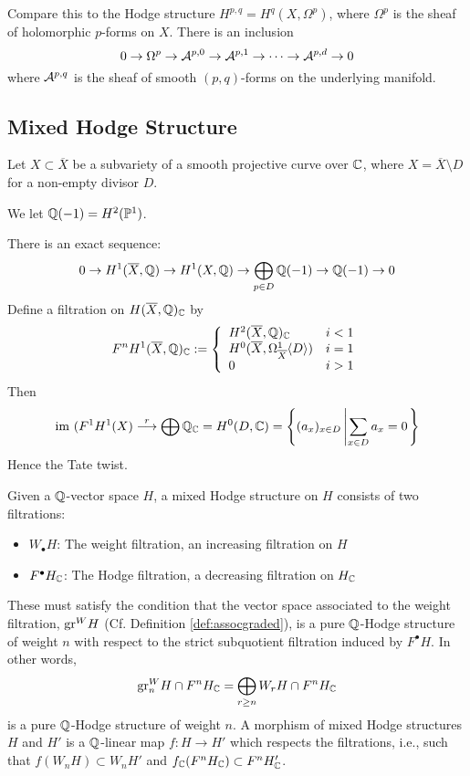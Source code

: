 Compare this to the Hodge structure $H^{p,q} = H^q(X, \Omega^p)$, where $\Omega^p$ is the sheaf of holomorphic $p$-forms on $X$. There is an inclusion
\[
0 \to \Omega^p \to \mathcal{A}^{p,0} \to \mathcal{A}^{p,1} \to \cdots \to \mathcal{A}^{p,d} \to 0
\]
where $\mathcal{A}^{p,q}$ is the sheaf of smooth $(p,q)$-forms on the underlying manifold.

\subsection{Mixed Hodge Structure}
Let $X \subset \overline{X}$ be a subvariety of a smooth projective curve over $\mathbb{C}$, where $X = \overline{X} \setminus D$ for a non-empty divisor $D$.
\begin{notation}\label{not:qminusone}
We let $\mathbb{Q}(-1) = H^2(\mathbb{P}^1)$.
\end{notation}
There is an exact sequence:
\[
0 \to H^1(\overline{X}, \mathbb{Q}) \to H^1(X, \mathbb{Q}) \to \bigoplus_{p \in D} \mathbb{Q}(-1) \to \mathbb{Q}(-1) \to 0
\]
Define a filtration on $H(\overline{X}, \mathbb{Q})_{\mathbb{C}}$ by
\[
F^nH^1(\overline{X},\mathbb{Q})_{\mathbb{C}} := \left\{ \begin{array}{ll}
H^2(\overline{X}, \mathbb{Q})_{\mathbb{C}} & i < 1 \\
H^0(\overline{X}, \Omega_{\overline{X}}^1 \langle D \rangle) & i = 1 \\
0 & i > 1
\end{array} \right.
\]
Then
\[
\mathrm{im}~(F^1H^1(X) \stackrel{r}{\longrightarrow} \bigoplus \mathbb{Q}_{\mathbb{C}} = H^0(D, \mathbb{C}) = \left\{ (a_x)_{x \in D} \left| \sum_{x \in D} a_x = 0 \right. \right\}
\]
Hence the Tate twist.

\begin{defn}\label{def:mixedhodge}
Given a $\mathbb{Q}$-vector space $H$, a mixed Hodge structure on $H$ consists of two filtrations: 
\begin{itemize}
\item[] $W_{\bullet} H$: The weight filtration, an increasing filtration on $H$
\item[] $F^{\bullet}H_{\mathbb{C}}$: The Hodge filtration, a decreasing filtration on $H_{\mathbb{C}}$
\end{itemize}
These must satisfy the condition that the vector space associated to the weight filtration, $\mathrm{gr}^W H$ (Cf. Definition \ref{def:assocgraded}), is a pure $\mathbb{Q}$-Hodge structure of weight $n$ with respect to the strict subquotient filtration induced by $F^{\bullet}H$. In other words,
\[
\mathrm{gr}_n^W H \cap F^nH_{\mathbb{C}} = \bigoplus_{r \geq n} W_rH \cap F^nH_{\mathbb{C}} 
\]
is a pure $\mathbb{Q}$-Hodge structure of weight $n$. A morphism of mixed Hodge structures $H$ and $H'$ is a $\mathbb{Q}$-linear map $f : H \to H'$ which respects the filtrations, i.e., such that $f(W_nH) \subset W_nH'$ and $f_{\mathbb{C}}(F^nH_{\mathbb{C}}) \subset F^nH'_{\mathbb{C}}$.
\end{defn}


